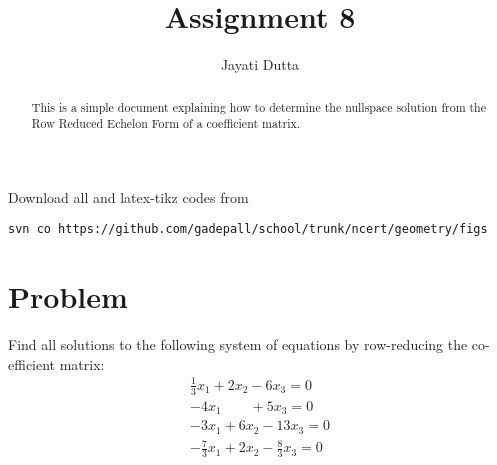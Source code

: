 \documentclass[journal,12pt,twocolumn]{IEEEtran}
\begin{document}
\let\StandardTheFigure\thefigure
\let\vec\mathbf
\renewcommand{\thefigure}{\theproblem}



\def\putbox#1#2#3{\makebox[0in][l]{\makebox[#1][l]{}\raisebox{\baselineskip}[0in][0in]{\raisebox{#2}[0in][0in]{#3}}}}
     \def\rightbox#1{\makebox[0in][r]{#1}}
     \def\centbox#1{\makebox[0in]{#1}}
     \def\topbox#1{\raisebox{-\baselineskip}[0in][0in]{#1}}
     \def\midbox#1{\raisebox{-0.5\baselineskip}[0in][0in]{#1}}

\vspace{3cm}


\title{Assignment 8}
\author{Jayati Dutta}





\maketitle

\newpage


\bigskip

\renewcommand{\thefigure}{\theenumi}
\renewcommand{\thetable}{\theenumi}


\begin{abstract}
This is a simple document explaining how to determine the nullspace solution from the Row Reduced Echelon Form of a coefficient matrix.
\end{abstract}

%

Download all and latex-tikz codes from 
%
\begin{lstlisting}
svn co https://github.com/gadepall/school/trunk/ncert/geometry/figs
\end{lstlisting}
%


\section{Problem}
Find all solutions to the following system of equations by row-reducing the co-efficient matrix:
\begin{align}
\frac{1}{3}x_1 +2x_2 - 6x_3 =0\\
-4x_1\quad \quad+ 5x_3=0\\
-3x_1+6x_2-13x_3=0\\
-\frac{7}{3}x_1 +2x_2 - \frac{8}{3}x_3 =0
\end{align}
\end{document}
